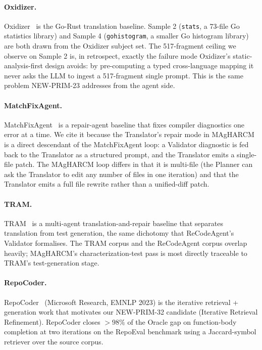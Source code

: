 \paragraph{Oxidizer.}
Oxidizer~\citep{oxidizer2024} is the Go-Rust translation baseline.
Sample 2 (\texttt{stats}, a 73-file Go statistics library) and
Sample 4 (\texttt{gohistogram}, a smaller Go histogram library) are
both drawn from the Oxidizer subject set. The 517-fragment ceiling we
observe on Sample 2 is, in retrospect, exactly the failure mode
Oxidizer's static-analysis-first design avoids: by pre-computing a
typed cross-language mapping it never asks the LLM to ingest a
517-fragment single prompt. This is the same problem NEW-PRIM-23
addresses from the agent side.

\paragraph{MatchFixAgent.}
MatchFixAgent~\citep{matchfixagent2025} is a repair-agent baseline that fixes
compiler diagnostics one error at a time. We cite it because the
Translator's repair mode in MAgHARCM is a direct descendant of the
MatchFixAgent loop: a Validator diagnostic is fed back to the
Translator as a structured prompt, and the Translator emits a
single-file patch. The MAgHARCM loop differs in that it is
multi-file (the Planner can ask the Translator to edit any number of
files in one iteration) and that the Translator emits a full file
rewrite rather than a unified-diff patch.

\paragraph{TRAM.}
TRAM~\citep{tram2025} is a multi-agent translation-and-repair baseline
that separates translation from test generation, the same dichotomy
that ReCodeAgent's Validator formalises. The TRAM corpus and the
ReCodeAgent corpus overlap heavily; MAgHARCM's characterization-test
pass is most directly traceable to TRAM's test-generation stage.

\paragraph{RepoCoder.}
RepoCoder~\citep{repocoder2023} (Microsoft Research, EMNLP 2023) is
the iterative retrieval + generation work that motivates our
NEW-PRIM-32 candidate (Iterative Retrieval Refinement). RepoCoder
closes $>98\%$ of the Oracle gap on function-body completion at two
iterations on the RepoEval benchmark using a Jaccard-symbol retriever
over the source corpus.

